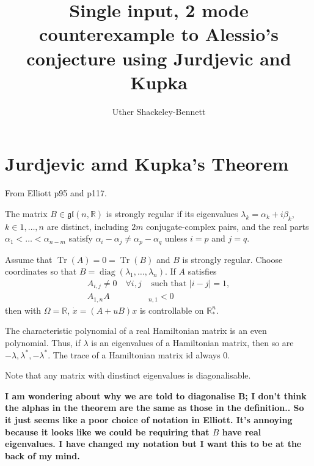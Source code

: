 


\title{Single input, 2 mode counterexample to Alessio's conjecture using Jurdjevic and Kupka}
\author{Uther Shackeley-Bennett}
\maketitle

\section{Jurdjevic amd Kupka's Theorem}
From Elliott p95 and p117.
\begin{definition} The matrix $B \in \mathfrak{gl}(n, \mathbb{R})$ is strongly regular if its eigenvalues $\lambda_k = \alpha_k +i\beta_k$, $k \in 1, \ldots, n$ are distinct, including $2m$ conjugate-complex
pairs, and the real parts $\alpha_1 < \ldots < \alpha_{n-m}$ satisfy $\alpha_i - \alpha_j \neq \alpha_p - \alpha_q$ unless $i = p$ and $j = q$.
\end{definition}

\begin{theorem}
 Assume that $\operatorname{Tr}(A) = 0 = \operatorname{Tr}(B)$ and $B$ is strongly regular. Choose coordinates so that $B = \operatorname{diag}(\lambda_1, \ldots, \lambda_n)$. If $A$ satisfies 
\begin{align}
 A_{i,j} \neq 0 \quad \forall i,j &\text{ such that } |i - j| = 1, \\
A_{1,n}A&_{n,1} < 0
\end{align}
then with $\Omega = \mathbb{R}$, $\dot{x} = (A + uB)x$ is controllable on $\mathbb{R}^n_*$.
\end{theorem}

\begin{proposition}
 The characteristic polynomial of a real Hamiltonian matrix is an even polynomial. Thus, if $\lambda$ is an eigenvalues of a Hamiltonian matrix, then so are $-\lambda, \lambda^*, -\lambda^*$. The trace of a Hamiltonian matrix id always $0$.
\end{proposition}

Note that any matrix with dinstinct eigenvalues is diagonalisable.

\textbf{I am wondering about why we are told to diagonalise B; I don't think the alphas in the theorem are the same as those in the definition.. So it just seems like a poor choice of notation in Elliott. It's annoying because it looks like we could be requiring that $B$ have real eigenvalues. I have changed my notation but I want this to be at the back of my mind.}

